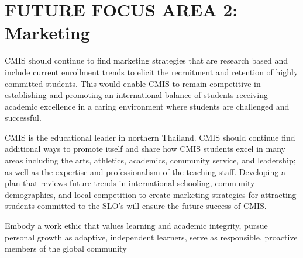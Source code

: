 \section{FUTURE FOCUS AREA 2: Marketing}

CMIS should continue to find marketing strategies that are research based and include current enrollment trends to elicit the recruitment and retention of highly committed students. This would enable CMIS to remain competitive in establishing and promoting an international balance of students receiving academic excellence in a caring environment where students are challenged and successful. 


CMIS is the educational leader in northern Thailand. CMIS should continue find additional ways to promote itself and share how CMIS students excel in many areas including the arts, athletics, academics, community service, and leadership; as well as the expertise and professionalism of the teaching staff. Developing a plan that reviews future trends in international schooling, community demographics, and local competition to create marketing strategies for attracting  students committed to the SLO’s will ensure the future success of CMIS. 


Embody a work ethic that values learning and academic integrity, pursue personal growth as adaptive, independent learners, serve as responsible, proactive members of the global community

